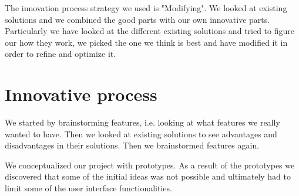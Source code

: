 The innovation process strategy we used is "Modifying". We looked at existing solutions and we combined the good parts with our own innovative parts. Particularly we have looked at the different existing solutions and tried to figure our how they work, we picked the one we think is best and have modified it in order to refine and optimize it.

\section*{Innovative process}

We started by brainstorming features, i.e. looking at what features we really wanted to have. Then we looked at existing solutions to see advantages and disadvantages in their solutions. Then we brainstormed features again.


We conceptualized our project with prototypes. As a result of the prototypes we discovered that some of the initial ideas was not possible and ultimately had to limit some of the user interface functionalities.

